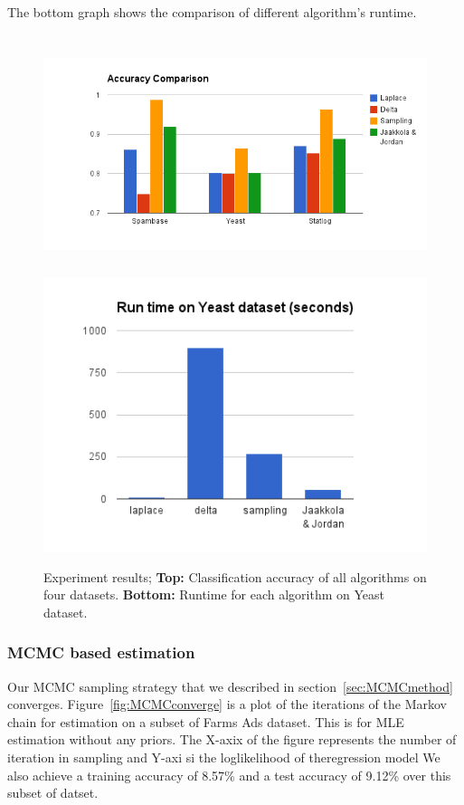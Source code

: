 The bottom graph shows the comparison of different algorithm's runtime.

\begin{figure}[t]
\centering
\includegraphics[height=7.0cm]{results/accuracy_comp.png}
\includegraphics[height=8.0cm]{results/speed_comp.png}

\caption{\small Experiment results; {\bf Top:} Classification accuracy of all algorithms on
four datasets. {\bf Bottom:} Runtime for each algorithm on Yeast dataset. }
\label{fig:results}
\end{figure}

\subsubsection{MCMC based estimation}
Our MCMC sampling strategy that we described in section~\ref{sec:MCMCmethod}
converges. Figure~\ref{fig:MCMCconverge} is a plot of the iterations of the Markov 
chain for estimation on a subset of Farms Ads dataset. This is for MLE
estimation without any priors. The X-axix of the figure represents the number of
iteration in sampling and Y-axi si the loglikelihood of theregression model We
also achieve a training accuracy of 8.57\% and a test accuracy of 9.12\% over 
this subset of datset. 

